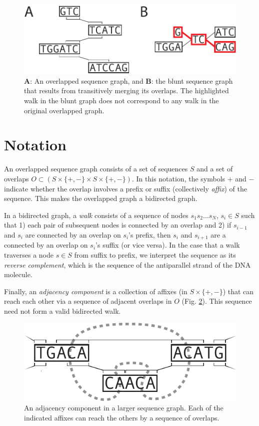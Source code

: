 \documentclass[11pt]{ucthesis}
\newcommand{\figref}[1]{Fig. \ref{fig:#1}}
\begin{document}
\begin{figure}
\begin{center}
\includegraphics[width=.8\textwidth]{bluntfigures/transitive_collapse.pdf}
\caption{\textbf{A}: An overlapped sequence graph, and \textbf{B}: the blunt sequence graph that results from transitively merging its overlaps. The highlighted walk in the blunt graph does not correspond to any walk in the original overlapped graph.} \label{fig:transitive}
\end{center}
\end{figure}

\section{Notation}

An overlapped sequence graph consists of a set of sequences $S$ and a set of overlaps $O \subset (S \times \{+,-\} \times S \times \{+,-\})$. 
In this notation, the symbols $+$ and $-$ indicate whether the overlap involves a prefix or suffix (collectively \emph{affix}) of the sequence.
This makes the overlapped graph a bidirected graph. 

In a bidirected graph, a \emph{walk} consists of a sequence of nodes $s_1s_2\ldots s_N$, $s_i \in S$ such that 1) each pair of subsequent nodes is connected by an overlap and 2) if $s_{i-1}$ and $s_i$ are connected by an overlap on $s_i$'s prefix, then $s_i$ and $s_{i+1}$ are a connected by an overlap on $s_i$'s suffix (or vice versa).
In the case that a walk traverses a node $s \in S$ from suffix to prefix, we interpret the sequence as its \emph{reverse complement}, which is the sequence of the antiparallel strand of the DNA molecule. 

Finally, an \emph{adjacency component} is a collection of affixes (in $S \times \{+,-\}$) that can reach each other via a sequence of adjacent overlaps in $O$ (\figref{adjacency}).
This sequence need not form a valid bidirected walk.

\begin{figure}
\begin{center}
\includegraphics[width=.6\textwidth]{bluntfigures/adjacency_component_3.pdf}
\caption{An adjacency component in a larger sequence graph. Each of the indicated affixes can reach the others by a sequence of overlaps.} \label{fig:adjacency}
\end{center}
\end{figure}
\end{document}
